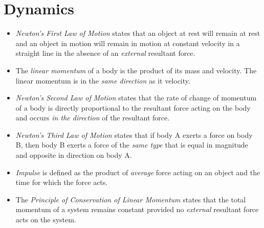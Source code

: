 \documentclass[oneside]{book}
\begin{document}
\chapter{Dynamics}
\begin{itemize}
    \item \emph{Newton's First Law of Motion} states that an object at rest will remain at rest and an object in motion will remain in motion at constant velocity in a straight line in the absence of an \emph{external} resultant force.
    \item The \emph{linear momentum} of a body is the product of its mass and velocity. The linear momentum is in the \emph{same direction} as it velocity.
    \item \emph{Newton's Second Law of Motion} states that the rate of change of momentum of a body is directly proportional to the resultant force acting on the body and occurs \emph{in the direction} of the resultant force.
    \item \emph{Newton's Third Law of Motion} states that if body A exerts a force on body B, then body B exerts a force of the \emph{same type} that is equal in magnitude and opposite in direction on body A.
    \item \emph{Impulse} is defined as the product of \emph{average} force acting on an object and the time for which the force acts.
    \item The \emph{Principle of Conservation of Linear Momentum} states that the total momentum of a system remains constant provided no \emph{external} resultant force acts on the system.
\end{itemize}
\end{document}
